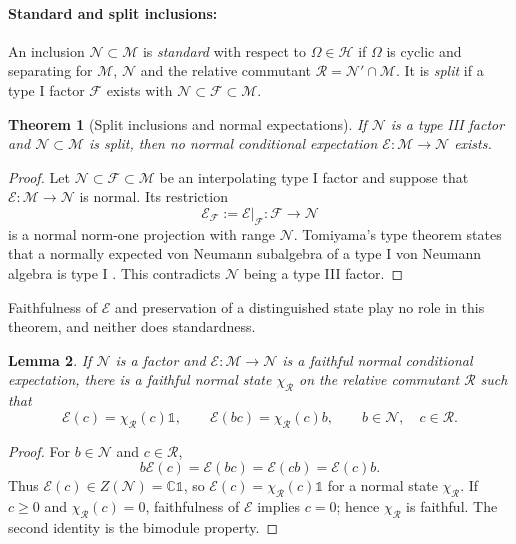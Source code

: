 \documentclass[a4paper,11pt]{article}
\newtheorem{theorem}{Theorem}
\newtheorem{lemma}[theorem]{Lemma}
\theoremstyle{definition}
\let\mathbbm\mathds
\newcommand{\mR}{\mathcal{R}}
\newcommand{\mN}{\mathcal{N}}
\newcommand{\mM}{\mathcal{M}}
\newcommand{\mE}{\mathcal{E}}
\begin{document}
\paragraph{Standard and split inclusions:}
An inclusion $\mN\subset\mM$ is
\emph{standard} with respect to $\Omega\in\mathcal H$ if $\Omega$ is cyclic
and separating for $\mM$, $\mN$ and the relative commutant $\mR=\mN'\cap \mM$. It is \emph{split} if a type I factor $\mathcal F$ exists with
$\mN\subset\mathcal F\subset\mM$.

\begin{theorem}[Split inclusions and normal expectations]\label{thm:split-no-expectation}
If $\mN$ is a type III factor and
$\mN\subset\mM$ is split, then no normal conditional expectation
$\mE:\mM\to\mN$ exists.
\end{theorem}

\begin{proof}
Let $\mN\subset\mathcal F\subset\mM$ be an interpolating type I
factor and suppose that $\mE:\mM\to \mN$ is normal.  Its restriction
\begin{equation}
 \mE_{\mathcal F}:=\mE|_{\mathcal F}:\mathcal F\longrightarrow\mN
\end{equation}
is a normal norm-one projection with range $\mN$.  Tomiyama's type
theorem states that a normally expected von Neumann subalgebra of a type I von
Neumann algebra is type I \cite{Tomiyama1959}\cite{Takesaki1972}. This contradicts $\mN$ being a type III factor.
\end{proof}

Faithfulness of $\mE$ and preservation of a distinguished state play no role in this theorem, and neither does standardness.

\begin{lemma}\label{lem:expectation-slice}
If $\mN$ is a factor and $\mE:\mM\to\mN$ is a faithful
normal conditional expectation, there is a faithful normal state $\chi_{\mR}$ on
the relative commutant $\mR$ such that
\begin{equation}
 \mE(c)=\chi_{\mR}(c)\mathbbm 1,
 \qquad \mE(b c)=\chi_{\mR}(c)b,
 \qquad b\in\mN,\quad c\in\mR.
\end{equation}
\end{lemma}

\begin{proof}
For $b\in\mN$ and $c\in\mR$,
\begin{equation}
 b \mE(c)=\mE(b c)=\mE(c b)=\mE(c)b.
\end{equation}
Thus $\mE(c)\in Z(\mN)=\mathbb C\mathbbm 1$, so
$\mE(c)=\chi_{\mR}(c)\mathbbm 1$ for a normal state $\chi_{\mR}$.  If $c\geq0$ and
$\chi_{\mR}(c)=0$, faithfulness of $\mE$ implies $c=0$; hence $\chi_{\mR}$ is faithful.  The
second identity is the bimodule property.
\end{proof}
\end{document}
